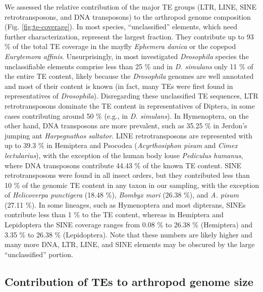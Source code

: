 We assessed the relative contribution of the major TE groups (LTR, LINE,
SINE retrotransposons, and DNA transposons) to the arthropod genome
composition (Fig. \ref{fig:te-coverage}). In most species, ``unclassified'' elements, which
need further characterization, represent the largest fraction. They
contribute up to 93 \% of the total TE coverage in the mayfly
\emph{Ephemera danica} or the copepod \emph{Eurytemora affinis}.
Unsurprisingly, in most investigated \emph{Drosophila} species the
unclassifiable elements comprise less than 25 \% and in \emph{D.
simulans} only 11 \% of the entire TE content, likely because the
\emph{Drosophila} genomes are well annotated and most of their content
is known (in fact, many TEs were first found in representatives of
\emph{Drosophila}). Disregarding these unclassified TE sequences, LTR
retrotransposons dominate the TE content in representatives of Diptera,
in some cases contributing around 50 \% (e.g., in \emph{D. simulans}).
In Hymenoptera, on the other hand, DNA transposons are more prevalent,
such as 35.25 \% in Jerdon's jumping ant \emph{Harpegnathos saltator}.
LINE retrotransposons are represented with up to 39.3 \% in Hemiptera
and Psocodea (\emph{Acyrthosiphon pisum} and \emph{Cimex lectularius}),
with the exception of the human body louse \emph{Pediculus humanus},
where DNA transposons contribute 44.43 \% of the known TE content. SINE
retrotransposons were found in all insect orders, but they contributed
less than 10 \% of the genomic TE content in any taxon in our sampling,
with the exception of \emph{Helicoverpa punctigera} (18.48 \%),
\emph{Bombyx mori} (26.38 \%), and \emph{A. pisum} (27.11 \%). In some
lineages, such as Hymenoptera and most dipterans, SINEs contribute less
than 1 \% to the TE content, whereas in Hemiptera and Lepidoptera the
SINE coverage ranges from 0.08 \% to 26.38 \% (Hemiptera) and 3.35 \% to
26.38 \% (Lepidoptera). Note that these numbers are likely higher and
many more DNA, LTR, LINE, and SINE elements may be obscured by the large
``unclassified'' portion.

\subsection{Contribution of TEs to arthropod genome
size}

